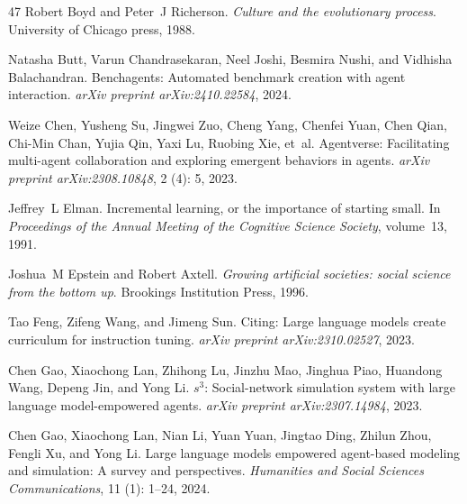 \begin{thebibliography}{47}
Robert Boyd and Peter~J Richerson.
\newblock \emph{Culture and the evolutionary process}.
\newblock University of Chicago press, 1988.

Natasha Butt, Varun Chandrasekaran, Neel Joshi, Besmira Nushi, and Vidhisha Balachandran.
\newblock Benchagents: Automated benchmark creation with agent interaction.
\newblock \emph{arXiv preprint arXiv:2410.22584}, 2024.

Weize Chen, Yusheng Su, Jingwei Zuo, Cheng Yang, Chenfei Yuan, Chen Qian, Chi-Min Chan, Yujia Qin, Yaxi Lu, Ruobing Xie, et~al.
\newblock Agentverse: Facilitating multi-agent collaboration and exploring emergent behaviors in agents.
\newblock \emph{arXiv preprint arXiv:2308.10848}, 2 (4): 5, 2023.

Jeffrey~L Elman.
\newblock Incremental learning, or the importance of starting small.
\newblock In \emph{Proceedings of the Annual Meeting of the Cognitive Science Society}, volume~13, 1991.

Joshua~M Epstein and Robert Axtell.
\newblock \emph{Growing artificial societies: social science from the bottom up}.
\newblock Brookings Institution Press, 1996.

Tao Feng, Zifeng Wang, and Jimeng Sun.
\newblock Citing: Large language models create curriculum for instruction tuning.
\newblock \emph{arXiv preprint arXiv:2310.02527}, 2023.

Chen Gao, Xiaochong Lan, Zhihong Lu, Jinzhu Mao, Jinghua Piao, Huandong Wang, Depeng Jin, and Yong Li.
\newblock $s^3$: Social-network simulation system with large language model-empowered agents.
\newblock \emph{arXiv preprint arXiv:2307.14984}, 2023.

Chen Gao, Xiaochong Lan, Nian Li, Yuan Yuan, Jingtao Ding, Zhilun Zhou, Fengli Xu, and Yong Li.
\newblock Large language models empowered agent-based modeling and simulation: A survey and perspectives.
\newblock \emph{Humanities and Social Sciences Communications}, 11 (1): 1--24, 2024.


\end{thebibliography}

